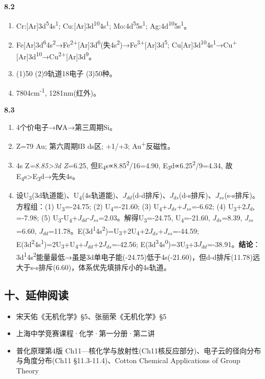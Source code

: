 \textbf{8.2}

\begin{enumerate}
\def\labelenumi{\arabic{enumi}.}
\setcounter{enumi}{4}
\item
  Cr:{[}Ar{]}3d\textsuperscript{5}4s\textsuperscript{1}; Cu:{[}Ar{]}3d\textsuperscript{10}4s\textsuperscript{1}; Mo:4d\textsuperscript{5}5s\textsuperscript{1}; Ag:4d\textsuperscript{10}5s\textsuperscript{1}。
\item
  Fe{[}Ar{]}3d\textsuperscript{6}4s\textsuperscript{2}→Fe\textsuperscript{2+}{[}Ar{]}3d\textsuperscript{6}(失4s\textsuperscript{2})→Fe\textsuperscript{3+}{[}Ar{]}3d\textsuperscript{5}; Cu{[}Ar{]}3d\textsuperscript{10}4s\textsuperscript{1}→Cu\textsuperscript{+}{[}Ar{]}3d\textsuperscript{10}→Cu\textsuperscript{2+}{[}Ar{]}3d\textsuperscript{9}。
\item
  (1)50 (2)9轨道18电子 (3)50种。
\item
  7804cm\textsuperscript{-1}, 1281nm(红外)。
\end{enumerate}

\textbf{8.3}

\begin{enumerate}
\def\labelenumi{\arabic{enumi}.}
\setcounter{enumi}{8}
\item
  4个价电子→ⅣA→第三周期Si。
\item
  Z=79 Au; 第六周期ⅠB ds区; +1/+3; Au\textsuperscript{+}反磁性。
\item
  4s Z\emph{=8.85\textgreater3d Z}=6.25, 但E\textsubscript{4}s∝8.85\textsuperscript{2}/16=4.90, E\textsubscript{3}d∝6.25\textsuperscript{2}/9=4.34, 故E\textsubscript{4}s\textgreater E\textsubscript{3}d→先失4s。
\item
  设U\textsubscript{3}(3d轨道能)、U\textsubscript{4}(4s轨道能)、\(J_{dd}\)(d-d排斥)、\(J_{ds}\)(d-s排斥)、\(J_{ss}\)(s-s排斥)。方程组：(1) U\textsubscript{3}=-24.75; (2) U\textsubscript{4}=-21.60; (3) U\textsubscript{4}+\(J_{ds}\)+\(J_{ss}\)=-6.62; (4) U\textsubscript{3}+2\(J_{ds}\)=-7.98; (5) U\textsubscript{3}-U\textsubscript{4}+\(J_{dd}\)-\(J_{ss}\)=2.03。解得U\textsubscript{3}=-24.75, U\textsubscript{4}=-21.60, \(J_{ds}\)=8.39, \(J_{ss}\)=6.60, \(J_{dd}\)=11.78。E(3d\textsuperscript{1}4s\textsuperscript{2})=U\textsubscript{3}+2U\textsubscript{4}+2\(J_{ds}\)+\(J_{ss}\)=-44.59; E(3d\textsuperscript{2}4s\textsuperscript{1})=2U\textsubscript{3}+U\textsubscript{4}+\(J_{dd}\)+2\(J_{ds}\)=-42.56; E(3d\textsuperscript{3}4s\textsuperscript{0})=3U\textsubscript{3}+3\(J_{dd}\)=-38.91。\textbf{结论}：3d\textsuperscript{1}4s\textsuperscript{2}能量最低→虽是3d单电子能(-24.75)低于4s(-21.60)，但d-d排斥(11.78)远大于s-s排斥(6.60)，体系优先填排斥小的4s轨道。
\end{enumerate}

\subsection{十、延伸阅读}\label{ux5341ux5ef6ux4f38ux9605ux8bfb}

\begin{itemize}
\tightlist
\item
  宋天佑《无机化学》§5、张丽荣《无机化学》§5
\item
  上海中学竞赛课程·化学·第一分册·第二讲
\item
  普化原理第4版 Ch11---核化学与放射性(Ch11核反应部分)、电子云的径向分布与角度分布(Ch11 §11.3-11.4)、Cotton Chemical Applications of Group Theory
\end{itemize}
